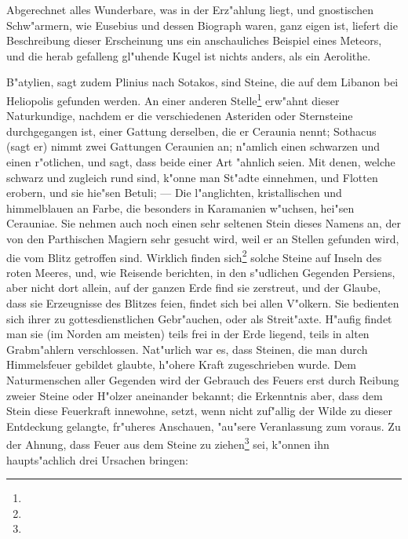 \documentclass[a4paper, 11pt, oneside, polutonikogreek, german]{article}
\begin{document}
Abgerechnet alles Wunderbare, was in der Erz"ahlung liegt, und gnostischen Schw"armern, wie Eusebius und dessen Biograph waren, ganz eigen ist, liefert die Beschreibung dieser Erscheinung uns ein anschauliches Beispiel eines Meteors, und die herab gefalleng gl"uhende Kugel ist nichts anders, als ein Aerolithe.

B"atylien, sagt zudem Plinius nach Sotakos, sind Steine, die auf dem Libanon bei Heliopolis gefunden werden. An einer anderen Stelle\footnote{} erw"ahnt dieser Naturkundige, nachdem er die verschiedenen Asteriden oder Sternsteine durchgegangen ist, einer Gattung derselben, die er Ceraunia nennt; Sothacus (sagt er) nimmt zwei Gattungen Ceraunien an; n"amlich einen schwarzen und einen r"otlichen, und sagt, dass beide einer Art "ahnlich seien. Mit denen, welche schwarz und zugleich rund sind, k"onne man St"adte einnehmen, und Flotten erobern, und sie hie"sen Betuli; --- Die l"anglichten, kristallischen und himmelblauen an Farbe, die besonders in Karamanien w"uchsen, hei"sen Cerauniae. Sie nehmen auch noch einen sehr seltenen Stein dieses Namens an, der von den Parthischen Magiern sehr gesucht wird, weil er an Stellen gefunden wird, die vom Blitz getroffen sind. Wirklich finden sich\footnote{} solche Steine auf Inseln des roten Meeres, und, wie Reisende berichten, in den s"udlichen Gegenden Persiens, aber nicht dort allein, auf der ganzen Erde find sie zerstreut, und der Glaube, dass sie Erzeugnisse des Blitzes feien, findet sich bei allen V"olkern. Sie bedienten sich ihrer zu gottesdienstlichen Gebr"auchen, oder als Streit"axte. H"aufig findet man sie (im Norden am meisten) teils frei in der Erde liegend, teils in alten Grabm"ahlern verschlossen. Nat"urlich war es, dass Steinen, die man durch Himmelsfeuer gebildet glaubte, h"ohere Kraft zugeschrieben wurde. Dem Naturmenschen aller Gegenden wird der Gebrauch des Feuers erst durch Reibung zweier Steine oder H"olzer aneinander bekannt; die Erkenntnis aber, dass dem Stein diese Feuerkraft innewohne, setzt, wenn nicht zuf"allig der Wilde zu dieser Entdeckung gelangte, fr"uheres Anschauen, "au"sere Veranlassung zum voraus. Zu der Ahnung, dass Feuer aus dem Steine zu ziehen\footnote{} sei, k"onnen ihn haupts"achlich drei Ursachen bringen:
\end{document}
